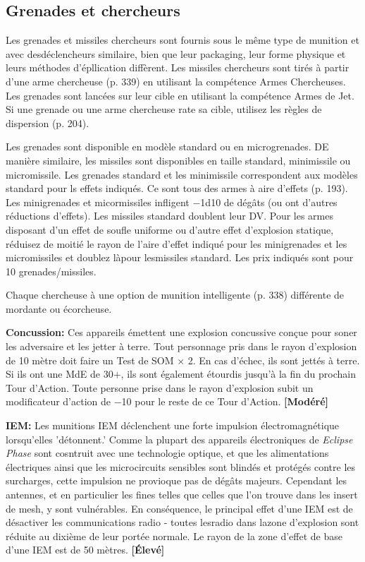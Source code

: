 \subsection{Grenades et chercheurs} \label{sec:grenades-seekers} 

Les grenades et missiles chercheurs sont fournis sous le même type de munition et avec desdéclencheurs similaire, bien que leur packaging, leur forme physique et leurs méthodes d'épllication diffèrent. Les missiles chercheurs sont tirés à partir d'une arme chercheuse (p. 339) en utilisant la compétence Armes Chercheuses. Les grenades sont lancées sur leur cible en utilisant la compétence Armes de Jet. Si une grenade ou une arme chercheuse rate sa cible, utilisez les règles de dispersion (p. 204). 

Les grenades sont disponible en modèle standard ou en microgrenades. DE manière similaire, les missiles sont disponibles en taille standard, minimissile ou micromissile. Les grenades standard et les minimissile correspondent aux modèles standard pour ls effets indiqués. Ce sont tous des armes à aire d'effets (p. 193). Les minigrenades et micormissiles infligent $-$1d10 de dégâts (ou ont d'autres réductions d'effets). Les missiles standard doublent leur DV. Pour les armes disposant d'un effet de soufle uniforme ou d'autre effet d'explosion statique, réduisez de moitié le rayon de l'aire d'effet indiqué pour les minigrenades et les micromissiles et doublez làpour lesmissiles standard. Les prix indiqués sont pour 10 grenades/missiles. 

Chaque chercheuse à une option de munition intelligente (p. 338) différente de mordante ou écorcheuse. 

\textbf{Concussion:} Ces appareils émettent une explosion concussive conçue pour soner les adversaire et les jetter à terre. Tout personnage pris dans le rayon d'explosion de 10 mètre doit faire un Test de SOM $\times$ 2. En cas d'échec, ils sont jettés à terre. Si ils ont une MdE de 30+, ils sont également étourdis jusqu'à la fin du prochain Tour d'Action. Toute personne prise dans le rayon d'explosion subit un modificateur d'action de $-$10 pour le reste de ce Tour d'Action. \textbf{[Modéré]} 

\textbf{IEM:} Les munitions IEM déclenchent une forte impulsion électromagnétique lorsqu'elles 'détonnent.' Comme la plupart des appareils électroniques de \emph{Eclipse Phase} sont cosntruit avec une technologie optique, et que les alimentations électriques ainsi que les microcircuits sensibles sont blindés et protégés contre les surcharges, cette impulsion ne provioque pas de dégâts majeurs. Cependant les antennes, et en particulier les fines telles que celles que l'on trouve dans les insert de mesh, y sont vulnérables. En conséquence, le principal effet d'une IEM est de désactiver les communications radio - toutes lesradio dans lazone d'explosion sont réduite au dixième de leur portée normale. Le rayon de la zone d'effet de base d'une IEM est de 50 mètres. \textbf{[Élevé]} 

